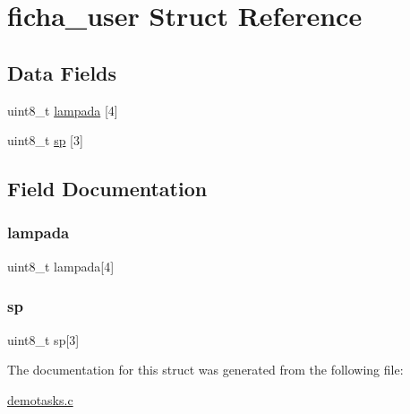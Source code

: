 \hypertarget{structficha__user}{}\section{ficha\+\_\+user Struct Reference}
\label{structficha__user}
\subsection*{Data Fields}
\begin{DoxyCompactItemize}
\item 
uint8\+\_\+t \mbox{\hyperlink{structficha__user_af17da8500c66903563bd5264086e039a}{lampada}} \mbox{[}4\mbox{]}
\item 
uint8\+\_\+t \mbox{\hyperlink{structficha__user_ae24cf240119f509e48bc4ff6e3645b90}{sp}} \mbox{[}3\mbox{]}
\end{DoxyCompactItemize}


\subsection{Field Documentation}
\mbox{\label{structficha__user_af17da8500c66903563bd5264086e039a}} 
\subsubsection{\texorpdfstring{lampada}{lampada}}
{\footnotesize\ttfamily uint8\+\_\+t lampada\mbox{[}4\mbox{]}}

\mbox{\label{structficha__user_ae24cf240119f509e48bc4ff6e3645b90}} 
\subsubsection{\texorpdfstring{sp}{sp}}
{\footnotesize\ttfamily uint8\+\_\+t sp\mbox{[}3\mbox{]}}



The documentation for this struct was generated from the following file\+:\begin{DoxyCompactItemize}
\item 
\mbox{\hyperlink{demotasks_8c}{demotasks.\+c}}\end{DoxyCompactItemize}
